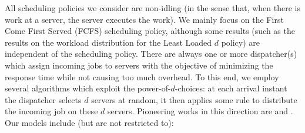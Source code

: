\documentclass[12pt]{report}
\begin{document}
All scheduling policies we consider are non-idling (in the sense that, when there is work at a server, the server executes the work). We mainly focus on the First Come First Served (FCFS) scheduling policy, although some results (such as the results on the workload distribution for the Least Loaded $d$ policy) are independent of the scheduling policy.
There are always one or more dispatcher(s) which assign incoming jobs to servers with the objective of minimizing the response time while not causing too much overhead. To this end, we employ several algorithms which exploit the power-of-$d$-choices: at each arrival instant the dispatcher selects $d$ servers at random, it then applies some rule to distribute the incoming job on these $d$ servers. Pioneering works in this direction are \cite{mitzenmacher4} and \cite{vvedenskaya3}.  Our models include (but are not restricted to):
\end{document}
